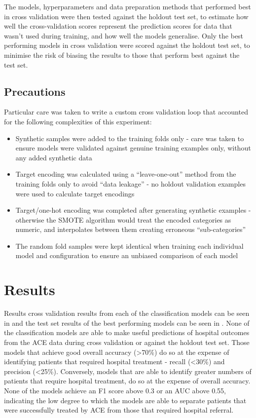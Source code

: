 The models, hyperparameters and data preparation methods that performed best in cross validation were then tested against the holdout test set, to estimate how well the cross-validation scores represent the prediction scores for data that wasn't used during training, and how well the models generalise. Only the best performing models in cross validation were scored against the holdout test set, to minimise the risk of biasing the results to those that perform best against the test set.

\subsection{Precautions}\label{subsec:precautions}
Particular care was taken to write a custom cross validation loop that accounted for the following complexities of this experiment:

\begin{itemize}
    \item Synthetic samples were added to the training folds only - care was taken to ensure models were validated against genuine training examples only, without any added synthetic data
    \item Target encoding was calculated using a ``leave-one-out'' method from the training folds only to avoid ``data leakage'' - no holdout validation examples were used to calculate target encodings
    \item Target/one-hot encoding was completed after generating synthetic examples - otherwise the SMOTE algorithm would treat the encoded categories as numeric, and interpolates between them creating erroneous ``sub-categories''
    \item The random fold samples were kept identical when training each individual model and configuration to ensure an unbiased comparison of each model
\end{itemize}

\section{Results}

Results cross validation results from each of the classification models can be seen in  and the test set results of the best performing models can be seen in . None of the classification models are able to make useful predictions of hospital outcomes from the ACE data during cross validation or against the holdout test set. Those models that achieve good overall accuracy (\textgreater 70\%) do so at the expense of identifying patients that required hospital treatment - recall (\textless 30\%) and precision (\textless 25\%). Conversely, models that are able to identify greater numbers of patients that require hospital treatment, do so at the expense of overall accuracy. None of the models achieve an F1 score above 0.3 or an AUC above 0.55, indicating the low degree to which the models are able to separate patients that were successfully treated by ACE from those that required hospital referral.

